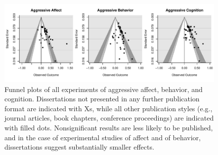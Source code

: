 \documentclass[man]{apa6}
\begin{document}
\begin{figure}
	\includegraphics[width = \textwidth, keepaspectratio]{funnel_diss.pdf}
	\caption{Funnel plots of all experiments of aggressive affect, behavior, and cognition. Dissertations not presented in any further publication format are indicated with Xs, while all other publication styles (e.g., journal articles, book chapters, conference proceedings) are indicated with filled dots. Nonsignificant results are less likely to be published, and in the case of experimental studies of affect and of behavior, dissertations suggest substantially smaller effects.}
	\label{funnel-diss}
\end{figure}
\end{document}
